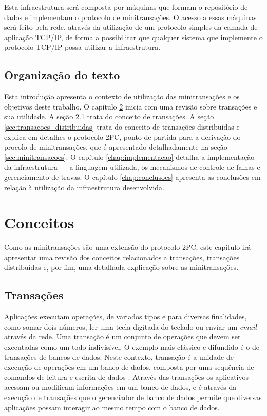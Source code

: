 \documentclass[11pt,twoside,a4paper]{book}
\begin{document}
Esta infraestrutura será composta por máquinas que formam o repositório de dados e implementam o protocolo de minitransações. O acesso a essas máquinas será feito pela rede, através da utilização de um protocolo simples da camada de aplicação TCP/IP, de forma a possibilitar que qualquer sistema que implemente o protocolo TCP/IP possa utilizar a infraestrutura.

\section{Organização do texto}
\label{sec:organizacao_do_texto}
Esta introdução apresenta o contexto de utilização das minitransações e os objetivos deste trabalho. O capítulo \ref{chap:conceitos} inicia com uma revisão sobre transações e sua utilidade. A seção \ref{sec:transacoes} trata do conceito de transações. A seção \ref{sec:transacoes_distribuidas} trata do conceito de transações distribuídas e explica em detalhes o protocolo 2PC, ponto de partida para a derivação do procolo de minitransações, que é apresentado detalhadamente na seção \ref{sec:minitransacoes}. O capítulo \ref{chap:implementacao} detalha a implementação da infraestrutura --- a linguagem utilizada, os mecanismos de controle de falhas e gerenciamento de travas. O capítulo \ref{chap:conclusoes} apresenta as conclusões em relação à utilização da infraestrutura desenvolvida.

\chapter{Conceitos}
\label{chap:conceitos}
Como as minitransações são uma extensão do protocolo 2PC, este capítulo irá apresentar uma revisão dos conceitos relacionados a transações, transações distribuídas e, por fim, uma detalhada explicação sobre as minitransações.

\section{Transações}
\label{sec:transacoes}
Aplicações executam operações, de variados tipos e para diversas finalidades, como somar dois números, ler uma tecla digitada do teclado ou enviar um \emph{email} através da rede. Uma transação é um conjunto de operações que devem ser executadas como um todo indivisível. O exemplo mais clássico e difundido é o de transações de bancos de dados. Neste contexto, transação é a unidade de execução de operações em um banco de dados, composta por uma sequência de comandos de leitura e escrita de dados \cite{garcia-molina, vaca}. Através das transações os aplicativos acessam ou modificam informações em um banco de dados, e é através da execução de transações que o gerenciador de banco de dados permite que diversas aplicações possam interagir ao mesmo tempo com o banco de dados.
\end{document}
